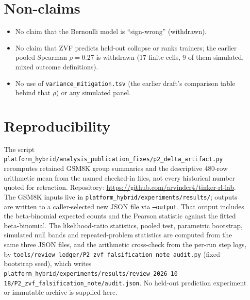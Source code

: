 \documentclass[11pt]{article}
\begin{document}
\section{Non-claims}
\begin{itemize}
  \item No claim that the Bernoulli model is ``sign-wrong'' (withdrawn).
  \item No claim that ZVF predicts held-out collapse or ranks trainers; the
    earlier pooled Spearman $\rho=0.27$ is withdrawn (17 finite cells, 9 of
    them simulated, mixed outcome definitions).
  \item No use of \texttt{variance\_mitigation.tsv} (the earlier draft's
    comparison table behind that $\rho$) or any simulated panel.
\end{itemize}

\section{Reproducibility}
The script \nolinkurl{platform_hybrid/analysis_publication_fixes/p2_delta_artifact.py}
recomputes retained GSM8K group summaries and the descriptive 480-row
arithmetic mean from the named checked-in files, not every historical number
quoted for retraction. Repository: \url{https://github.com/arvindcr4/tinker-rl-lab}.
The GSM8K inputs live in \nolinkurl{platform_hybrid/experiments/results/};
outputs are written to a caller-selected new JSON file via \texttt{--output}.
That output includes the beta-binomial expected counts and the Pearson
statistic against the fitted beta-binomial. The likelihood-ratio statistics,
pooled test, parametric bootstrap, simulated null bands and repeated-problem
statistics are computed from the same three JSON files, and the arithmetic
cross-check from the per-run step logs, by
\nolinkurl{tools/review_ledger/P2_zvf_falsification_note_audit.py} (fixed
bootstrap seed), which writes
\nolinkurl{platform_hybrid/experiments/results/review_2026-10-18/P2_zvf_falsification_note/audit.json}.
No held-out prediction experiment or immutable archive is supplied here.
\end{document}
